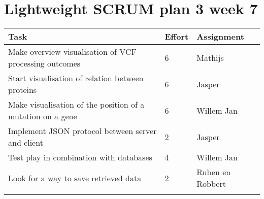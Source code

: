 \documentclass[a4paper]{report}
\begin{document}


\section*{Lightweight SCRUM plan 3 week 7}

\setlength\extrarowheight{5pt}
\begin{table}[ht]
\begin{tabular}{p{8cm}|p{2cm}|p{3cm}}

\textbf{Task} & \textbf{Effort} & \textbf{Assignment}\\
\hline \hline

Make overview visualisation of VCF processing outcomes & 6 & Mathijs \\
Start visualisation of relation between proteins & 6 & Jasper \\
Make visualisation of the position of a mutation on a gene & 6 & Willem Jan\\

Implement JSON protocol between server and client & 2 & Jasper\\
Test play in combination with databases & 4 & Willem Jan\\
Look for a way to save retrieved data & 2 & Ruben en Robbert\\

\vspace{10pt} & \vspace{10pt} & \vspace{10pt}\\

\end{tabular}
\end{table}
\end{document}
